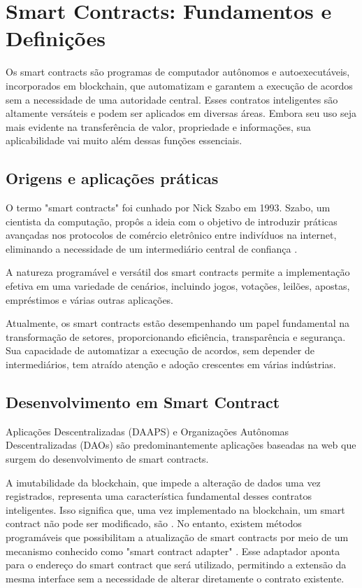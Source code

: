 \section{Smart Contracts: Fundamentos e Definições}

Os smart contracts são programas de computador autônomos e autoexecutáveis, incorporados em blockchain, que automatizam e garantem a execução de acordos sem a necessidade de uma autoridade central.
Esses contratos inteligentes são altamente versáteis e podem ser aplicados em diversas áreas. Embora seu uso seja mais evidente na transferência de valor, propriedade e informações, sua aplicabilidade vai muito além dessas funções essenciais.


\subsection{Origens e aplicações práticas}
O termo "smart contracts" foi cunhado por Nick Szabo em 1993. Szabo, um cientista da computação, propôs a ideia com o objetivo de introduzir práticas avançadas nos protocolos de comércio eletrônico entre indivíduos na internet, eliminando a necessidade de um intermediário central de confiança \cite{vector}. 

 A natureza programável e versátil dos smart contracts permite a implementação efetiva em uma variedade de cenários, incluindo jogos, votações, leilões, apostas, empréstimos e várias outras aplicações.

Atualmente, os smart contracts estão desempenhando um papel fundamental na transformação de setores, proporcionando eficiência, transparência e segurança. Sua capacidade de automatizar a execução de acordos, sem depender de intermediários, tem atraído atenção e adoção crescentes em várias indústrias.



\subsection{Desenvolvimento em Smart Contract}

Aplicações Descentralizadas (DAAPS) e Organizações Autônomas Descentralizadas (DAOs) são predominantemente aplicações baseadas na web que surgem do desenvolvimento de smart contracts. 

A imutabilidade da blockchain, que impede a alteração de dados uma vez registrados, representa uma característica fundamental desses contratos inteligentes. Isso significa que, uma vez implementado na blockchain, um smart contract não pode ser modificado, são . No entanto, existem métodos programáveis que possibilitam a atualização de smart contracts por meio de um mecanismo conhecido como "smart contract adapter"  \cite{atualizarSM}. Esse adaptador aponta para o endereço do smart contract que será utilizado, permitindo a extensão da mesma interface sem a necessidade de alterar diretamente o contrato existente.

